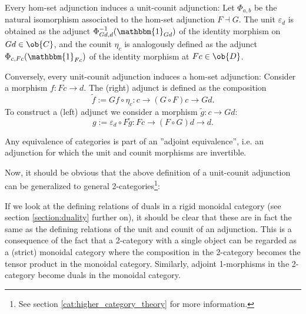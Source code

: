     \begin{property}
        Every hom-set adjunction induces a unit-counit adjunction: Let $\Phi_{a,b}$ be the natural isomorphism associated to the hom-set adjunction $F\dashv G$. The unit $\varepsilon_d$ is obtained as the adjunct $\Phi^{-1}_{Gd,d}(\mathbbm{1}_{Gd})$ of the identity morphism on $Gd\in\ob{C}$, and the counit $\eta_c$ is analogously defined as the adjunct $\Phi_{c,Fc}(\mathbbm{1}_{Fc})$ of the identity morphism at $Fc\in\ob{D}$.

        Conversely, every unit-counit adjunction induces a hom-set adjunction: Consider a morphism $f:Fc\rightarrow d$. The (right) adjunct is defined as the composition \[\tilde{f}:=Gf\circ\eta_c:c\rightarrow (G\circ F)c\rightarrow Gd.\] To construct a (left) adjunct we consider a morphism $\tilde{g}:c\rightarrow Gd$: \[g:=\varepsilon_d\circ F\tilde{g}: Fc\rightarrow (F\circ G)d\rightarrow d.\]
    \end{property}

    \begin{property}
        Any equivalence of categories is part of an ''adjoint equivalence'', i.e. an adjunction for which the unit and counit morphisms are invertible.
    \end{property}

    Now, it should be obvious that the above definition of a unit-counit adjunction can be generalized to general 2-categories\footnote{See section \ref{cat:higher_category_theory} for more information.}:
    \begin{remark}
        If we look at the defining relations of duals in a rigid monoidal category (see section \ref{section:duality} further on), it should be clear that these are in fact the same as the defining relations of the unit and counit of an adjunction. This is a consequence of the fact that a 2-category with a single object can be regarded as a (strict) monoidal category where the composition in the 2-category becomes the tensor product in the monoidal category. Similarly, adjoint 1-morphisms in the 2-category become duals in the monoidal category.
    \end{remark}

